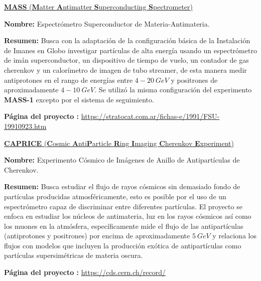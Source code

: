 \href{https://stratocat.com.ar/fichas-e/1991/FSU-19910923.htm}{\textbf{MASS} (\textbf{M}atter \textbf{A}ntimatter \textbf{S}uperconducting \textbf{S}pectrometer)}
\begin{itemize_f}\label{mass}
\item \textbf{Nombre:} Espectrómetro Superconductor de Materia-Antimateria.
\item \textbf{Resumen:} Busca con la adaptación de la configuración básica de la Instalación de Imanes en Globo investigar partículas de alta energía usando un espectrómetro de imán superconductor, un dispositivo de tiempo de vuelo, un contador de gas cherenkov y un calorímetro de imagen de tubo streamer, de esta manera medir antiprotones en el rango de energías entre $4-20~GeV$ y positrones de aproximadamente $4-10~GeV$. Se utilizó la misma configuración del experimento \textbf{MASS-1} excepto por el sistema de seguimiento.

\item \textbf{Página del proyecto :} \href{https://stratocat.com.ar/fichas-e/1991/FSU-19910923.htm}{https://stratocat.com.ar/fichas-e/1991/\-FSU-19910923.htm}
\end{itemize_f}

\href{https://core.ac.uk/display/25103181}{\textbf{CAPRICE} (\textbf{C}osmic \textbf{A}nti\textbf{P}article \textbf{R}ing \textbf{I}maging \textbf{C}herenkov \textbf{E}xperiment)}
\begin{itemize_f}
\item \textbf{Nombre:} Experimento Cósmico de Imágenes de Anillo de Antipartículas de Cherenkov.
\item \textbf{Resumen:} Busca estudiar el flujo de rayos cósmicos sin demasiado fondo de partículas producidas atmosféricamente, esto es posible por el uso de un espectrómetro capaz de discriminar entre diferentes partículas. El proyecto se enfoca en estudiar los núcleos de antimateria, luz en los rayos cósmicos así como los muones en la atmósfera, específicamente mide el flujo de las antipartículas (antiprotones y positrones) por encima de aproximadamente $5~ GeV$ y relaciona los flujos con modelos que incluyen la producción exótica de antipartículas como partículas supersimétricas de materia oscura. %
\item \textbf{Página del proyecto :} \href{https://cds.cern.ch/record/5608}{https://cds.cern.ch/record/}
\end{itemize_f}

